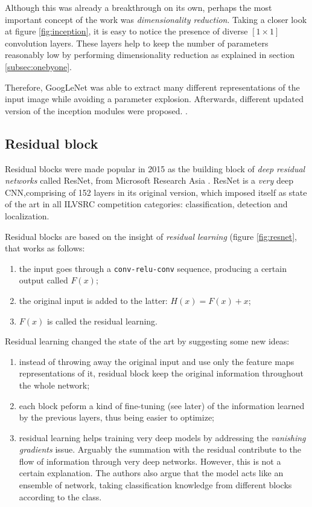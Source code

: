 Although this was already a breakthrough on its own, perhaps the most important concept of the work was \emph{dimensionality reduction}. Taking a closer look at figure \ref{fig:inception}, it is easy to notice the presence of diverse $[1 \times 1]$ convolution layers. These layers help to keep the number of parameters reasonably low by performing dimensionality reduction as explained in section \ref{subsec:onebyone}. 

Therefore, GoogLeNet was able to extract many different representations of the input image while avoiding a parameter explosion. Afterwards, different updated version of the inception modules were proposed. \parencite{incpetion3} \parencite{inception4}.

\subsection{Residual block}
Residual blocks were made popular in 2015 as the building block of \emph{deep residual networks} called ResNet, from Microsoft Research Asia \parencite{resnet}. ResNet is a \emph{very} deep CNN,comprising of 152 layers in its original version, which imposed itself as state of the art in all ILVSRC competition categories: classification, detection and localization. 
\newline 

Residual blocks are based on the insight of \emph{residual learning} (figure \ref{fig:resnet}, that works as follows: 
\begin{enumerate}
    \item the input goes through a \texttt{conv-relu-conv} sequence, producing a certain output called $F(x)$; 
    
    \item the original input is added to the latter: $H(x) = F(x) + x $; 
    
    \item $F(x)$ is called the residual learning. 
\end{enumerate}

Residual learning changed the state of the art by suggesting some new ideas: 
\begin{enumerate}
    \item instead of throwing away the original input and use only the feature maps representations of it, residual block keep the original information throughout the whole network; 
    
    \item each block peform a kind of fine-tuning (see later) of the information learned by the previous layers, thus being easier to optimize; 
    
    \item residual learning helps training very deep models by addressing the  \emph{vanishing gradients} issue. Arguably the summation with the residual contribute to the flow of information through very deep networks. However, this is not a certain explanation. The authors also argue that the model acts like an ensemble of network, taking classification knowledge from different blocks according to the class. 
    
\end{enumerate}


